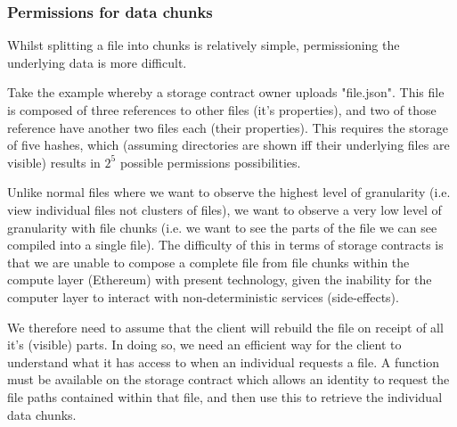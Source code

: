 \subsubsection{Permissions for data chunks}

Whilst splitting a file into chunks is relatively simple, permissioning the underlying data is more difficult.

Take the example whereby a storage contract owner uploads "file.json". This file is composed of three references to other files (it's properties), and two of those reference have another two files each (their properties). This requires the storage of five hashes, which (assuming directories are shown iff their underlying files are visible) results in $2^5$ possible permissions possibilities.

Unlike normal files where we want to observe the highest level of granularity (i.e. view individual files not clusters of files), we want to observe a very low level of granularity with file chunks (i.e. we want to see the parts of the file we can see compiled into a single file). The difficulty of this in terms of storage contracts is that we are unable to compose a complete file from file chunks within the compute layer (Ethereum) with present technology, given the inability for the computer layer to interact with non-deterministic services (side-effects).

We therefore need to assume that the client will rebuild the file on receipt of all it's (visible) parts. In doing so, we need an efficient way for the client to understand what it has access to when an individual requests a file. A function must be available on the storage contract which allows an identity to request the file paths contained within that file, and then use this to retrieve the individual data chunks.
